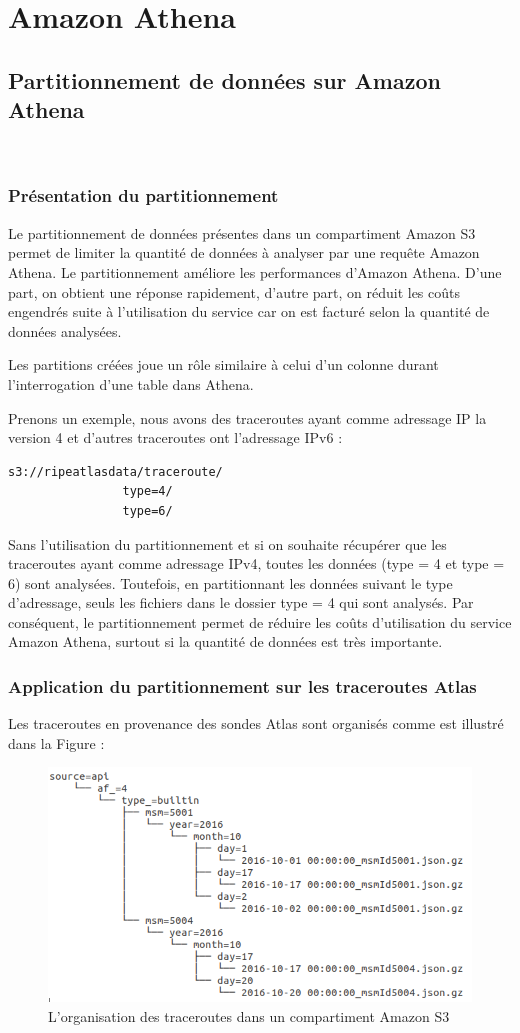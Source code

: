 \appendix

\chapter{Amazon Athena } \label{athena-appendix}


\section{Partitionnement de données sur Amazon Athena } \label{subsubsection:partitionnement}~
\subsection{Présentation du partitionnement}
Le partitionnement  de données présentes dans un compartiment Amazon S3 permet de limiter la quantité de données à analyser par une requête Amazon Athena. Le partitionnement améliore  les performances d'Amazon Athena. D'une part, on obtient une réponse rapidement, d'autre part, on réduit les coûts engendrés  suite à l'utilisation du service car on est facturé selon la quantité de données analysées.  

Les partitions créées joue un rôle similaire à celui d'un colonne durant l'interrogation d'une table dans Athena. 

Prenons un exemple, nous avons des traceroutes ayant comme adressage IP la version  4 et d'autres traceroutes ont l'adressage IPv6 :

\begin{lstlisting}
s3://ripeatlasdata/traceroute/
				type=4/
				type=6/
\end{lstlisting}

Sans l'utilisation du partitionnement et si on souhaite récupérer que les traceroutes ayant comme adressage IPv4, toutes les données (type = 4 et type = 6) sont analysées. Toutefois, en partitionnant les données suivant le type d'adressage, seuls les fichiers dans le dossier type = 4 qui sont analysés. Par conséquent, le partitionnement permet de réduire les coûts d'utilisation du service Amazon Athena, surtout si la quantité de données est très importante. 


\subsection{Application du partitionnement sur les traceroutes Atlas}

Les traceroutes en provenance des sondes Atlas sont organisés comme est illustré dans la Figure :

\begin{figure}[H]
	\centering
	\includegraphics[width=0.6\linewidth]{illustrations/partitionnement-athena}
	\caption{L'organisation des traceroutes dans un compartiment Amazon S3}
	\label{fig:partitionnement-athena}
\end{figure}
 



